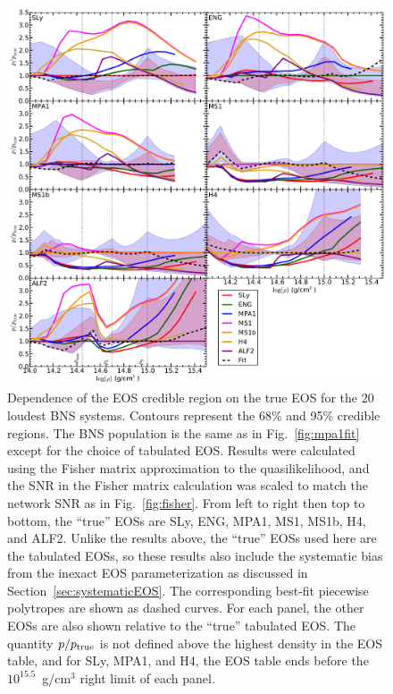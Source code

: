\documentclass[twocolumn,prd,amssymb,aps,nofootinbib,showpacs,epsf]{revtex4}
\begin{document}
\begin{figure}[!htb]
\begin{center}
\includegraphics[width=6.4in]{perroralleos.pdf}
\caption{Dependence of the EOS credible region on the true EOS for the 20 loudest BNS systems. Contours represent the 68\% and 95\% credible regions. The BNS population is the same as in Fig.~\ref{fig:mpa1fit} except for the choice of tabulated EOS. Results were calculated using the Fisher matrix approximation to the quasilikelihood, and the SNR in the Fisher matrix calculation was scaled to match the network SNR as in Fig.~\ref{fig:fisher}. From left to right then top to bottom, the ``true'' EOSs are SLy, ENG, MPA1, MS1, MS1b, H4, and ALF2. Unlike the results above, the ``true'' EOSs used here are the tabulated EOSs, so these results also include the systematic bias from the inexact EOS parameterization as discussed in Section~\ref{sec:systematicEOS}. The corresponding best-fit piecewise polytropes are shown as dashed curves. For each panel, the other EOSs are also shown relative to the ``true'' tabulated EOS. The quantity $p/p_{\rm true}$ is not defined above the highest density in the EOS table, and for SLy, MPA1, and H4, the EOS table ends before the $10^{15.5}$~g/cm$^3$ right limit of each panel.}
\label{fig:perroralleos}
\end{center}
\end{figure}
\end{document}
